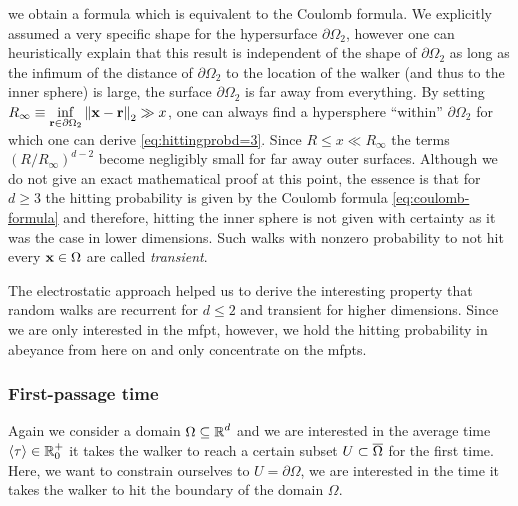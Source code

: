 \begin{description}
 we obtain a formula which is equivalent to the Coulomb formula. We explicitly assumed a very specific shape for the hypersurface $\partial\Omega_2$, however one can heuristically explain that this result is independent of the shape of $\partial\Omega_2$ as long as the infimum of the distance of $\partial\Omega_2$ to the location of the walker (and thus to the inner sphere) is large, \ie the surface $\partial\Omega_2$ is far away from everything. By setting $R_\infty \equiv \inf\limits_{\mathbf{r}\in\partial\Omega_2} \left\|\mathbf{x}-\mathbf{r}\right\|_2 \gg x$, one can always find a hypersphere ``within'' $\partial\Omega_2$ for which one can derive \autoref{eq:hittingprobd=3}. Since $R \leq x \ll R_\infty$ the terms $(R/R_\infty)^{d-2}$ become negligibly small for far away outer surfaces. Although we do not give an exact mathematical proof at this point, the essence is that for $d\geq3$ the hitting probability is given by the Coulomb formula \ref{eq:coulomb-formula} and therefore, hitting the inner sphere is not given with certainty as it was the case in lower dimensions. Such walks with nonzero probability to not hit every $\mathbf{x} \in \Omega$ are called \textit{transient}.
\end{description}

\bigskip

\noindent The electrostatic approach helped us to derive the interesting property that random walks are recurrent for $d \leq 2$ and transient for higher dimensions. Since we are only interested in the \ac{mfpt}, however, we hold the hitting probability in abeyance from here on and only concentrate on the \acp{mfpt}.

\subsubsection{First-passage time}
Again we consider a domain $\Omega\subseteq\operatorname{\mathbb{R}}^d$ and we are interested in the average time $\left<\tau\right> \in \operatorname{\mathbb{R}}_0^+$ it takes the walker to reach a certain subset $U\subset\overline{\Omega}$ for the first time. Here, we want to constrain ourselves to $U=\partial\Omega$, \ie we are interested in the time it takes the walker to hit the boundary of the domain $\Omega$.

